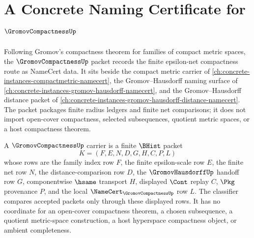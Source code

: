 \chapter{A Concrete Naming Certificate for $\GromovCompactnessUp$}
\label{ch:concrete-instances-gromov-compactness-namecert}

Following Gromov's compactness theorem for families of compact metric spaces, the $\GromovCompactnessUp$ packet records the finite epsilon-net compactness route as NameCert data. It sits beside the compact metric carrier of \autoref{ch:concrete-instances-compactmetric-namecert}, the Gromov--Hausdorff naming surface of \autoref{ch:concrete-instances-gromov-hausdorff-namecert}, and the Gromov--Hausdorff distance packet of \autoref{ch:concrete-instances-gromov-hausdorff-distance-namecert}. The packet packages finite radius ledgers and finite net comparisons; it does not import open-cover compactness, selected subsequences, quotient metric spaces, or a host compactness theorem.

\begin{definition}
\label{def:gromov-compactness-carrier}
A $\GromovCompactnessUp$ carrier is a finite $\BHist$ packet
$$
K=(F,E,N,D,G,H,C,P,L)
$$
whose rows are the family index row $F$, the finite epsilon-scale row $E$, the finite net row $N$, the distance-comparison row $D$, the $\GromovHausdorffUp$ handoff row $G$, componentwise $\hsame$ transport $H$, displayed $\Cont$ replay $C$, $\Pkg$ provenance $P$, and the local $\NameCert_{\GromovCompactnessUp}$ row $L$. The classifier compares accepted packets only through these displayed rows. It has no coordinate for an open-cover compactness theorem, a chosen subsequence, a quotient metric-space construction, a host hyperspace compactness object, or ambient completeness.
\end{definition}

